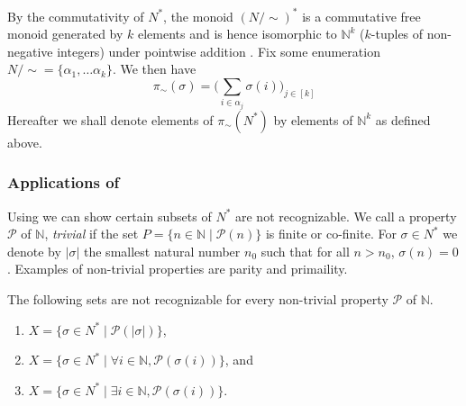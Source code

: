 \documentclass{llncs}
\begin{document}
By the commutativity of $N^*$, the monoid $(N/\sim)^*$ is a commutative free monoid generated by $k$ elements and is hence isomorphic to $\mathbb{N}^k$ ($k$-tuples of non-negative integers) under pointwise addition \cite{sakarovitch2009elements}. Fix some enumeration $N/\sim = \{\alpha_1, \dots \alpha_k\}$. We then have
\begin{equation*}
  \pi_\sim(\sigma) = \Big(\sum\limits_{i \in \alpha_j} \sigma(i)\Big)_{j \in [k]}
\end{equation*}
Hereafter we shall denote elements of $\pi_\sim(N^*)$ by elements of $\mathbb{N}^k$ as defined above.

\subsubsection{Applications of }

Using  we can show certain subsets of $N^*$ are not recognizable. We call a property $\mathcal{P}$ of $\mathbb{N}$, \emph{trivial} if the set $P = \{n \in \mathbb{N} \mid \mathcal{P}(n)\}$ is finite or co-finite. For $\sigma \in N^*$ we denote by $|\sigma|$ the smallest natural number $n_0$ such that for all $n > n_0$, $\sigma(n) = 0$. Examples of non-trivial properties are parity and primaility.

\begin{proposition} The following sets are not recognizable for every non-trivial property $\mathcal{P}$ of $\mathbb{N}$.
  \begin{enumerate}
    \item $X = \{\sigma \in N^* \mid \mathcal{P}(|\sigma|)\}$, 
    \item $X = \{\sigma \in N^* \mid \forall i \in \mathbb{N}, \mathcal{P}(\sigma(i))\}$, and 
  \item $X = \{\sigma \in N^* \mid \exists i \in \mathbb{N}, \mathcal{P}(\sigma(i))\}$.   \end{enumerate}
  \label{prop:non-recognizable-subsets-of-N*}
\end{proposition}
\end{document}
